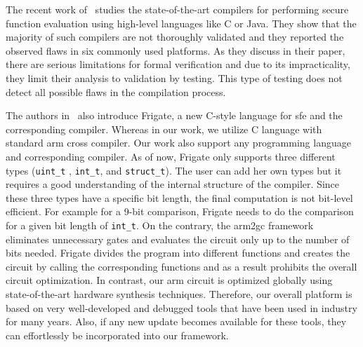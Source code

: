 The recent work of~\cite{mood2016frigate} studies the state-of-the-art compilers for performing secure function evaluation using high-level languages like C or Java.
They show that the majority of such compilers are not thoroughly validated and they reported the observed flaws in six commonly used platforms.
As they discuss in their paper, there are serious limitations for formal verification and due to its impracticality, they limit their analysis to validation by testing.
This type of testing does not detect all possible flaws in the compilation process.

The authors in~\cite{mood2016frigate} also introduce Frigate, a new C-style language for \acrshort{sfe} and the corresponding compiler.
Whereas in our work, we utilize C language with standard \gls{arm} cross compiler.
Our work also support any programming language and corresponding compiler.
As of now, Frigate only supports three different types (\texttt{uint\_t} , \texttt{int\_t}, and \texttt{struct\_t}).
The user can add her own types but it requires a good understanding of the internal structure of the compiler.
Since these three types have a specific bit length, the final computation is not bit-level efficient.
For example for a 9-bit comparison, Frigate needs to do the comparison for a given bit length of \texttt{int\_t}.
On the contrary, the \gls{arm2gc} framework eliminates unnecessary gates and evaluates the circuit only up to the number of bits needed.
Frigate divides the program into different functions and creates the circuit by calling the corresponding functions and as a result prohibits the overall circuit optimization.
In contrast, our \gls{arm} circuit is optimized globally using state-of-the-art hardware synthesis techniques.
Therefore, our overall platform is based on very well-developed and debugged tools that have been used in industry for many years.
Also, if any new update becomes available for these tools, they can effortlessly be incorporated into our framework.
